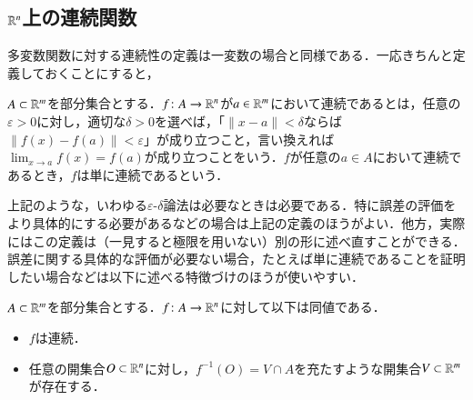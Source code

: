 \subsection{$\mathbb{R}^n$上の連続関数}

多変数関数に対する連続性の定義は一変数の場合と同様である．一応きちんと定義しておくことにすると，

\begin{defi}
$A \subset \mathbb{R}^m$を部分集合とする．$f \colon A \to \mathbb{R}^n$が$a \in \mathbb{R}^m$において連続であるとは，任意の$\varepsilon > 0$に対し，適切な$\delta > 0$を選べば，「$\|x - a\| < \delta$ならば$\| f(x) - f(a) \| < \varepsilon$」が成り立つこと，言い換えれば$\lim_{x \to a}f(x) = f(a)$が成り立つことをいう．$f$が任意の$a \in A$において連続であるとき，$f$は単に連続であるという．
\end{defi}

上記のような，いわゆる$\varepsilon$-$\delta$論法は必要なときは必要である．特に誤差の評価をより具体的にする必要があるなどの場合は上記の定義のほうがよい．他方，実際にはこの定義は（一見すると極限を用いない）別の形に述べ直すことができる．誤差に関する具体的な評価が必要ない場合，たとえば単に連続であることを証明したい場合などは以下に述べる特徴づけのほうが使いやすい．

\begin{thm}\label{開集合の引き戻しは開集合}
$A \subset \mathbb{R}^m$を部分集合とする．$f \colon A \to \mathbb{R}^n$に対して以下は同値である．
\begin{itemize}
\item $f$は連続．
\item 任意の開集合$O \subset \mathbb{R}^n$に対し，$f^{-1}(O) = V \cap A$を充たすような開集合$V \subset \mathbb{R}^m$が存在する．
\end{itemize}
\end{thm}

